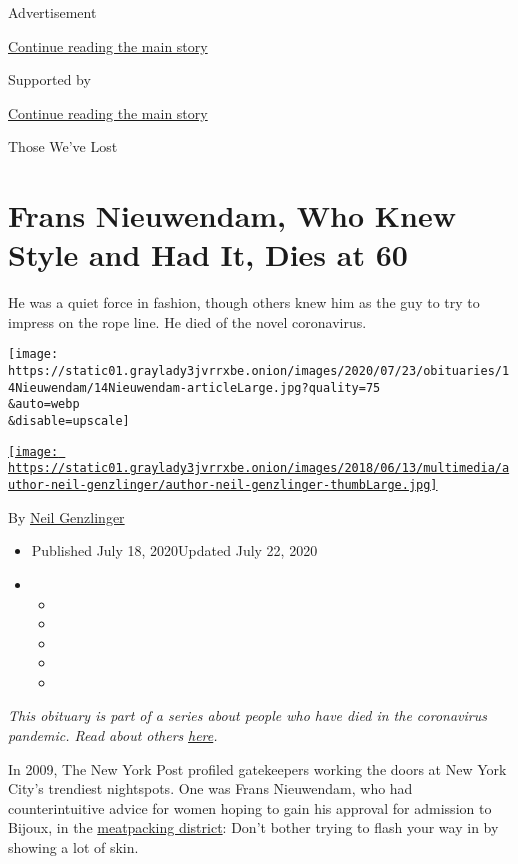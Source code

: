 Advertisement

\protect\hyperlink{after-top}{Continue reading the main story}

Supported by

\protect\hyperlink{after-sponsor}{Continue reading the main story}

Those We've Lost

\hypertarget{frans-nieuwendam-who-knew-style-and-had-it-dies-at-60}{%
\section{Frans Nieuwendam, Who Knew Style and Had It, Dies at
60}\label{frans-nieuwendam-who-knew-style-and-had-it-dies-at-60}}

He was a quiet force in fashion, though others knew him as the guy to
try to impress on the rope line. He died of the novel coronavirus.

\texttt{[image: https://static01.graylady3jvrrxbe.onion/images/2020/07/23/obituaries/14Nieuwendam/14Nieuwendam-articleLarge.jpg?quality=75\\\&auto=webp\\\&disable=upscale]}

\href{https://www.nytimes3xbfgragh.onion/by/neil-genzlinger}{\texttt{[image: https://static01.graylady3jvrrxbe.onion/images/2018/06/13/multimedia/author-neil-genzlinger/author-neil-genzlinger-thumbLarge.jpg]}}

By \href{https://www.nytimes3xbfgragh.onion/by/neil-genzlinger}{Neil
Genzlinger}

\begin{itemize}
\item
  Published July 18, 2020Updated July 22, 2020
\item
  \begin{itemize}
  \item
  \item
  \item
  \item
  \item
  \end{itemize}
\end{itemize}

\emph{This obituary is part of a series about people who have died in
the coronavirus pandemic. Read about others}
\href{https://www.nytimes3xbfgragh.onion/interactive/2020/obituaries/people-died-coronavirus-obituaries.html}{\emph{here}}\emph{.}

In 2009, The New York Post profiled gatekeepers working the doors at New
York City's trendiest nightspots. One was Frans Nieuwendam, who had
counterintuitive advice for women hoping to gain his approval for
admission to Bijoux, in the
\href{https://www.meatpacking-district.com/}{meatpacking district}:
Don't bother trying to flash your way in by showing a lot of skin.


